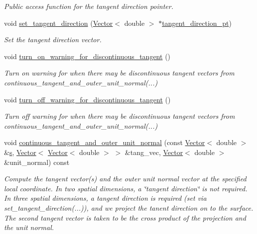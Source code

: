 \begin{DoxyCompactItemize}
\begin{DoxyCompactList}\small\item\em Public access function for the tangent direction pointer. \end{DoxyCompactList}\item 
void \hyperlink{classoomph_1_1FaceElement_a9dc897bfa6a1738a7a81ab9cd160ffb0}{set\+\_\+tangent\+\_\+direction} (\hyperlink{classoomph_1_1Vector}{Vector}$<$ double $>$ $\ast$\hyperlink{classoomph_1_1FaceElement_a361f92bae4d926903947e2e0d7672f3c}{tangent\+\_\+direction\+\_\+pt})
\begin{DoxyCompactList}\small\item\em Set the tangent direction vector. \end{DoxyCompactList}\item 
void \hyperlink{classoomph_1_1FaceElement_a025b2cae37ba7d8067bf87f885cd11f5}{turn\+\_\+on\+\_\+warning\+\_\+for\+\_\+discontinuous\+\_\+tangent} ()
\begin{DoxyCompactList}\small\item\em Turn on warning for when there may be discontinuous tangent vectors from continuous\+\_\+tangent\+\_\+and\+\_\+outer\+\_\+unit\+\_\+normal(...) \end{DoxyCompactList}\item 
void \hyperlink{classoomph_1_1FaceElement_a4c3159cad8dd11618c201d8b66651cd3}{turn\+\_\+off\+\_\+warning\+\_\+for\+\_\+discontinuous\+\_\+tangent} ()
\begin{DoxyCompactList}\small\item\em Turn off warning for when there may be discontinuous tangent vectors from continuous\+\_\+tangent\+\_\+and\+\_\+outer\+\_\+unit\+\_\+normal(...) \end{DoxyCompactList}\item 
void \hyperlink{classoomph_1_1FaceElement_a182997beb4a64fde40a47007344913f1}{continuous\+\_\+tangent\+\_\+and\+\_\+outer\+\_\+unit\+\_\+normal} (const \hyperlink{classoomph_1_1Vector}{Vector}$<$ double $>$ \&\hyperlink{cfortran_8h_ab7123126e4885ef647dd9c6e3807a21c}{s}, \hyperlink{classoomph_1_1Vector}{Vector}$<$ \hyperlink{classoomph_1_1Vector}{Vector}$<$ double $>$ $>$ \&tang\+\_\+vec, \hyperlink{classoomph_1_1Vector}{Vector}$<$ double $>$ \&unit\+\_\+normal) const
\begin{DoxyCompactList}\small\item\em Compute the tangent vector(s) and the outer unit normal vector at the specified local coordinate. In two spatial dimensions, a \char`\"{}tangent direction\char`\"{} is not required. In three spatial dimensions, a tangent direction is required (set via set\+\_\+tangent\+\_\+direction(...)), and we project the tanent direction on to the surface. The second tangent vector is taken to be the cross product of the projection and the unit normal. \end{DoxyCompactList}\item 

\end{DoxyCompactItemize}
